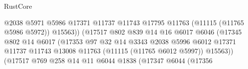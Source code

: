 \begin{lexlean}{RustCore}
\begin{coremodule}
                                                  @2038
                                                  @5971
                                                  @5986
                                                  @17371
                                                  @11737
                                                  @11743
                                                  @17795
                                                  @11763
                                                  (@11115 (@11765 @5986 @5972))
                                                  @15563))
                                              (@17517
                                                @802
                                                @839
                                                @14
                                                @16
                                                @6017
                                                @6046
                                                (@17345
                                                  @802
                                                  @14
                                                  @6017
                                                  (@17353
                                                    @97
                                                    @32
                                                    @14
                                                    @3343
                                                    @2038
                                                    @5996
                                                    @6012
                                                    @17371
                                                    @11737
                                                    @11743
                                                    @13008
                                                    @11763
                                                    (@11115 (@11765 @6012 @5997))
                                                    @15563))
                                                (@17517
                                                  @769
                                                  @258
                                                  @14
                                                  @11
                                                  @6044
                                                  @1838
                                                  (@17347
                                                    @6044
                                                    (@17356

\end{coremodule}
\end{lexlean}
